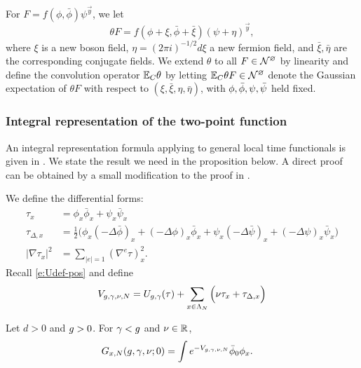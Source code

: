 For $F = f(\phi, \bar\phi) \psi^{\vec y}$, we let
\begin{equation}
\theta F = f(\phi + \xi, \bar\phi + \bar\xi) (\psi + \eta)^{\vec y},
\end{equation}
where $\xi$ is a new boson field, $\eta = (2\pi i)^{-1/2} d\xi$ a new fermion field,
and $\bar\xi, \bar\eta$ are the corresponding conjugate fields.
We extend $\theta$ to all $F \in \mathcal{N}^\varnothing$ by linearity
and define the convolution operator $\mathbb{E}_C\theta$ by letting
$\mathbb{E}_C\theta F \in \mathcal{N}^\varnothing$ denote the Gaussian expectation of $\theta F$ with respect
to $(\xi, \bar\xi, \eta, \bar\eta)$, with $\phi,\bar\phi,\psi,\bar\psi$ held fixed.

\subsubsection{Integral representation of the two-point function}
\label{sec:Gintrep}

An integral representation formula applying to general local time functionals
is given in \cite{BEI92,BIS09}. We state the result we need in the proposition below.
A direct proof can be obtained by a small modification to the proof in
\cite[Appendix~A]{ST-phi4}.

We define the differential forms:
\begin{align}
\label{e:taudef}
\tau_x
	&=
\phi_x \bar\phi_x + \psi_x \bar\psi_x
	\\
\label{e:addDelta}
\tau_{\Delta,x}
	&=
\frac 12
\Big(
	\phi_{x} (- \Delta \bar{\phi})_{x} + (- \Delta \phi)_{x} \bar{\phi}_{x}
		+
	\psi_{x}  (- \Delta \bar{\psi})_{x} + (- \Delta \psi)_{x}  \bar{\psi}_{x}
\Big)
	\\
\label{e:nablatau}
|\nabla \tau_x|^2
	&=
\sum_{|e|=1} (\nabla^e \tau)_x^2.
\end{align}
Recall \eqref{e:Udef-pos} and define
\begin{equation}
\label{e:Vdef2}
V_{g,\gamma,\nu,N}
	=
U_{g,\gamma}(\tau)
	+
\sum_{x\in\Lambda_N}
\Big(
	\nu \tau_x + \tau_{\Delta,x}
\Big)
\end{equation}

\begin{prop}
Let $d > 0$ and $g > 0$. For $\gamma < g$ and $\nu \in {\mathbb R}$,
\begin{align}
\label{e:Grep-pos-bis}
G_{x,N}(g, \gamma, \nu; 0)
	&=
\int e^{-V_{g,\gamma,\nu,N}} \bar\phi_0 \phi_x.
\end{align}
\end{prop}

